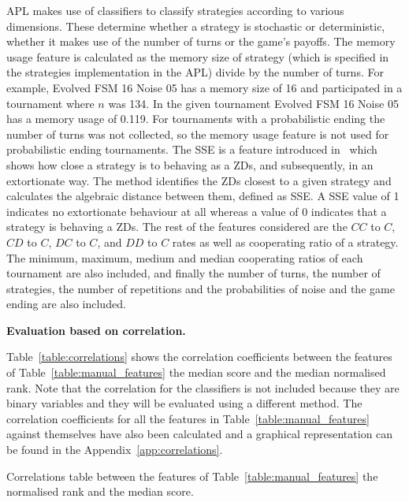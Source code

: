 \documentclass{article}
\begin{document}
APL makes use of classifiers to classify strategies according to
various dimensions. These determine whether
a strategy is stochastic or deterministic, whether it makes use of the number of
turns or the game's payoffs. The memory usage feature is calculated as the
memory size of strategy (which is specified in the strategies implementation
in the APL) divide by the number of turns. For example, Evolved
FSM 16 Noise 05 has a memory size of 16 and participated in a tournament where
$n$ was 134. In the given tournament Evolved FSM 16 Noise 05 has a memory usage
of 0.119. For tournaments with a probabilistic ending the number of turns was
not collected, so the memory usage feature is not used for probabilistic ending
tournaments. The SSE is a feature introduced in~\cite{Knight2019} which shows
how close a strategy is to behaving as a ZDs, and subsequently, in an
extortionate way. The method identifies the ZDs closest to a given strategy and
calculates the algebraic distance between them, defined as SSE. A SSE value of 1
indicates no extortionate behaviour at all whereas a value of 0 indicates that a
strategy is behaving a ZDs. The rest of the features considered are the $CC$ to
$C$, $CD$ to $C$, $DC$ to $C$, and $DD$ to $C$ rates as well as cooperating
ratio of a strategy. The minimum, maximum, medium and median cooperating ratios
of each tournament are also included, and finally the number of turns, the
number of strategies, the number of repetitions and the probabilities of noise
and the game ending are also included.

\textbf{Evaluation based on correlation.}

Table~\ref{table:correlations} shows the correlation coefficients between the
features of Table~\ref{table:manual_features} the median score and the median
normalised rank. Note that the correlation for the classifiers is
not included because they are binary variables and they will be evaluated using a
different method. The correlation coefficients for all the features in
Table~\ref{table:manual_features} against themselves have also been calculated and a
graphical representation can be found in the Appendix~\ref{app:correlations}.

\begin{table}[!htbp]
    \begin{center}
    \resizebox{.9\textwidth}{!}{
        
    }
\end{center}
\caption{Correlations table between the features of Table~\ref{table:manual_features}
the normalised rank and the median score.}\label{table:correlations}
\end{table}
\end{document}
